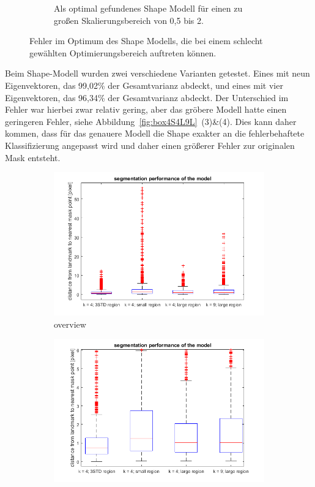 \documentclass[]{report}
\begin{document}
\begin{enumerate}
\begin{enumerate}
\begin{figure}
\begin{subfigure}[t]{0.3\textwidth}
						\caption{Als optimal gefundenes Shape Modell für einen zu großen Skalierungsbereich von 0,5 bis 2.}
						\label{fig:image31_wrongScalingRange}
					\end{subfigure}
				\caption{Fehler im Optimum des Shape Modells, die bei einem schlecht gewählten Optimierungsbereich auftreten können.}	
				\end{figure}
				Beim Shape-Modell wurden zwei verschiedene Varianten getestet. Eines mit neun Eigenvektoren, das 99,02\% der Gesamtvarianz abdeckt, und eines mit vier Eigenvektoren, das 96,34\% der Gesamtvarianz abdeckt. Der Unterschied im Fehler war hierbei zwar relativ gering, aber das gröbere Modell hatte einen geringeren Fehler, siehe Abbildung~\ref{fig:box4S4L9L}~(3)\&(4). Dies kann daher kommen, dass für das genauere Modell die Shape exakter an die fehlerbehaftete Klassifizierung angepasst wird und daher einen größerer Fehler zur originalen Mask entsteht.\\ 
				\begin{figure}
					\begin{subfigure}[t]{0.48\textwidth}
						\centering
						\includegraphics[width=\textwidth]{figures/box_4STD_4S_4L_9L.png}
						\caption{overview}
					\end{subfigure}
					\quad
					\begin{subfigure}[t]{0.48\textwidth}
						\centering
						\includegraphics[width=\textwidth]{figures/box_4STD_4S_4L_9L_zoomed.png}

\end{subfigure}
\end{figure}
\end{enumerate}
\end{enumerate}
\end{document}
